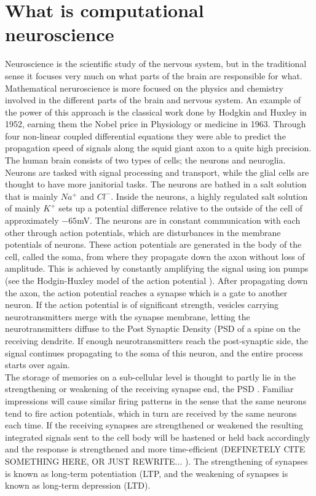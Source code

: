 \documentclass[main.tex]{subfiles}
\begin{document}
\section{What is computational neuroscience}
Neuroscience is the scientific study of the nervous system, but in the traditional sense it focuses very much on what parts of the brain are responsible for what. 
Mathematical neruroscience is more focused on the physics and chemistry involved in the different parts of the brain and nervous system. 
An example of the power of this approach is the classical work done by Hodgkin and Huxley in 1952, earning them the Nobel price in Physiology or medicine in 1963. 
Through four non-linear coupled differential equations they were able to predict the propagation speed of signals along the squid giant axon to a quite high precision. \\


The human brain consists of two types of cells; the neurons and neuroglia. 
Neurons are tasked with signal processing and transport, while the glial cells are thought to have more janitorial tasks. 
The neurons are bathed in a salt solution that is mainly $Na^+$ and $Cl^-$. 
Inside the neurons, a highly regulated salt solution of mainly $K^+$ sets up a potential difference relative to the outside of the cell of approximately $-65$mV.
The neurons are in constant communication with each other through action potentials, which are disturbances in the membrane potentials of neurons. 
These action potentials are generated in the body of the cell, called the soma, from where they propagate down the axon without loss of amplitude. 
This is achieved by constantly amplifying the signal using ion pumps (see the Hodgin-Huxley model of the action potential \cite{graham2011principles}).
After propagating down the axon, the action potential reaches a synapse which is a gate to another neuron. 
If the action potential is of significant strength, vesicles carrying neurotransmitters merge with the synapse membrane, letting the neurotransmitters diffuse to the Post Synaptic Density (PSD of a spine on the receiving dendrite.
If enough neurotransmitters reach the post-synaptic side, the signal continues propagating to the soma of this neuron, and the entire process starts over again. \\
The storage of memories on a sub-cellular level is thought to partly lie in the strengthening or weakening of the receiving synapse end, the PSD \cite{}. 
Familiar impressions will cause similar firing patterns in the sense that the same neurons tend to fire action potentials, which in turn are received by the same neurons each time. 
If the receiving synapses are strengthened or weakened the resulting integrated signals sent to the cell body will be hastened or held back accordingly and the response is strengthened and more time-efficient (DEFINETELY CITE SOMETHING HERE, OR JUST REWRITE... \cite{}). 
The strengthening of synapses is known as long-term potentiation (LTP, and the weakening of synapses is known as long-term depression (LTD). \\
\end{document}
